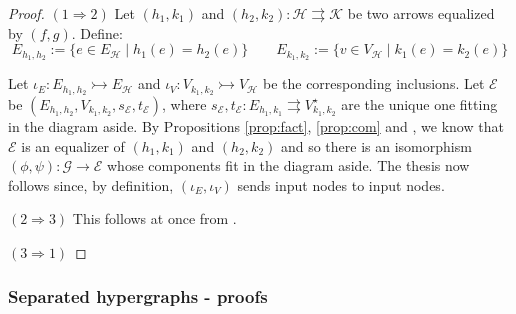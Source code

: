 \documentclass[3p]{elsarticle}
\newcommand{\mto}{\rightarrowtail}
\theoremstyle{remark}
\theoremstyle{definition}
\begin{document}
\regmono*
\begin{proof}\label{proof:regmon} $(1\Rightarrow 2)$ Let $(h_1, k_1)$ and $(h_2, k_2): \mathcal{H}\rightrightarrows \mathcal{K}$  be two arrows  equalized by $(f,g)$. Define:
\[ E_{h_1, h_2}:= \{e\in E_{\mathcal{H}} \mid h_1(e) = h_2(e)\} \qquad E_{k_1, k_2}:= \{v\in V_{\mathcal{H}} \mid k_1(e) = k_2(e)\} \]	
	
	\noindent 
 \begin{minipage}[r]{.7\linewidth} 	\setlength{\parindent}{1.5em}
Let $\iota_E\colon E_{h_1, h_2}\mto E_{\mathcal{H}} $ and $\iota_V\colon V_{k_1, k_2}\mto V_{\mathcal{H}}$ be the corresponding inclusions. Let $\mathcal{E}$ be  $(E_{h_1, h_2}, V_{k_1, k_2}, s_{\mathcal{E}}, t_{\mathcal{E}})$, where $s_{\mathcal{E}}, t_{\mathcal{E}} \colon E_{h_1, k_1}\rightrightarrows V^\star_{k_1, k_2}$ are the unique one fitting in the diagram aside. By Propositions \ref{prop:fact}, \ref{prop:com} and , we know that $\mathcal{E}$ is an equalizer of $(h_1, k_1)$ and $(h_2, k_2)$ and so  there is an isomorphism $(\phi, \psi) \colon \mathcal{G}\to \mathcal{E}$ whose components fit in the diagram aside. 
The thesis now follows since, by definition, $(\iota_E, \iota_V)$ sends input nodes to input nodes.
		\end{minipage}\hfill 	 \begin{minipage}[r]{.25\linewidth}
	 \end{minipage}
	
	
	\smallskip \noindent
	$(2\Rightarrow 3)$ This follows at once from .
	
	\smallskip \noindent
	$(3\Rightarrow 1)$
\end{proof} 

\subsubsection{Separated hypergraphs - proofs}
\end{document}
